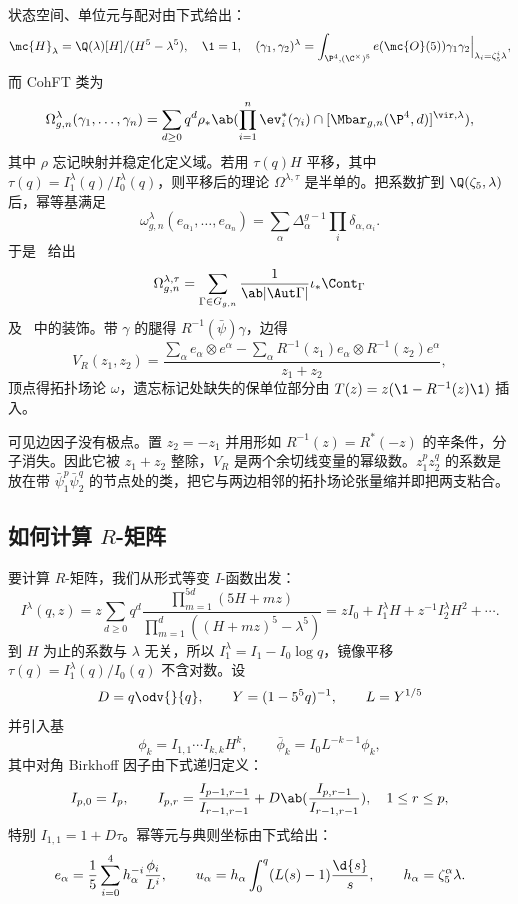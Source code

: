 状态空间、单位元与配对由下式给出：
\[ \mc{H}_{\lambda} = \Q(\lambda)[H]/(H^5-\lambda^5), \quad \1 = 1, \quad (\gamma_1,\gamma_2)^{\lambda} = \int_{\P^4, (\C^{\times})^5} e(\mc{O}(5))\gamma_1\gamma_2 \Big|_{\lambda_i = \zeta_5^i\lambda}, \]
而 CohFT 类为
\[ \Omega^{\lambda}_{g,n}(\gamma_1, \ldots, \gamma_n) = \sum_{d \geq 0} q^d \rho_* \ab( \prod_{i=1}^n \ev_i^*(\gamma_i) \cap [\Mbar_{g,n}(\P^4,d)]^{\vir,\lambda}), \]
其中 \(\rho\) 忘记映射并稳定化定义域。若用 \(\tau(q)H\) 平移，其中 \(\tau(q) = I^{\lambda}_1(q)/I^{\lambda}_0(q)\)，则平移后的理论 \(\Omega^{\lambda,\tau}\) 是半单的。把系数扩到 \(\Q(\zeta_5,\lambda)\) 后，幂等基满足
\[ \omega^{\lambda}_{g,n}(e_{\alpha_1}, \ldots, e_{\alpha_n}) = \sum_{\alpha}\Delta_{\alpha}^{g-1}\prod_i \delta_{\alpha,\alpha_i}. \]
于是~ 给出
\[ \Omega^{\lambda,\tau}_{g,n} = \sum_{\Gamma \in G_{g,n}} \frac{1}{\ab|\Aut\Gamma|}\iota_* \Cont_{\Gamma} \]
及~ 中的装饰。带 \(\gamma\) 的腿得 \(R^{-1}(\bar{\psi})\gamma\)，边得
\[ V_R(z_1,z_2) = \frac{\sum_{\alpha} e_{\alpha}\otimes e^{\alpha} - \sum_{\alpha} R^{-1}(z_1)e_{\alpha} \otimes R^{-1}(z_2)e^{\alpha}}{z_1+z_2}, \]
顶点得拓扑场论 \(\omega\)，遗忘标记处缺失的保单位部分由 \(T(z) = z(\1 - R^{-1}(z)\1)\) 插入。

\begin{rmk}
    可见边因子没有极点。置 \(z_2 = -z_1\) 并用形如 \(R^{-1}(z) = R^*(-z)\) 的辛条件，分子消失。因此它被 \(z_1+z_2\) 整除，\(V_R\) 是两个余切线变量的幂级数。\(z_1^p z_2^q\) 的系数是放在带 \(\bar{\psi}_1^p \bar{\psi}_2^q\) 的节点处的类，把它与两边相邻的拓扑场论张量缩并即把两支粘合。
\end{rmk}

\subsection{如何计算 \(R\)-矩阵}%
\label{sub:How to compute the R-matrix (Guo)}

要计算 \(R\)-矩阵，我们从形式等变 \(I\)-函数出发：
\[ I^{\lambda}(q,z) = z\sum_{d\geq0}q^d \frac{\prod_{m=1}^{5d}(5H+mz)}{\prod_{m=1}^d ((H+mz)^5 - \lambda^5)} = zI_0 + I_1^{\lambda}H + z^{-1}I_2^{\lambda}H^2 + \cdots. \]
到 \(H\) 为止的系数与 \(\lambda\) 无关，所以 \(I_1^{\lambda} = I_1 - I_0 \log q\)，镜像平移 \(\tau(q) = I_1^{\lambda}(q)/I_0(q)\) 不含对数。设
\[ D = q\odv{}{q}, \qquad Y = (1-5^5q)^{-1}, \qquad L = Y^{1/5} \]
并引入基
\[ \phi_k = I_{1,1}\cdots I_{k,k}H^k, \qquad \bar{\phi}_k = I_0 L^{-k-1}\phi_k, \]
其中对角 Birkhoff 因子由下式递归定义：
\[ I_{p,0} = I_p, \qquad I_{p,r} = \frac{I_{p-1,r-1}}{I_{r-1,r-1}} + D \ab( \frac{I_{p,r-1}}{I_{r-1,r-1}}), \quad 1 \leq r \leq p, \]
特别 \(I_{1,1} = 1+D\tau\)。幂等元与典则坐标由下式给出：
\[ e_{\alpha} = \frac{1}{5}\sum_{i=0}^4 h_{\alpha}^{-i}\frac{\phi_i}{L^i}, \qquad u_{\alpha} = h_{\alpha}\int_0^q (L(s)-1)\frac{\d{s}}{s}, \qquad h_{\alpha} = \zeta_5^{\alpha}\lambda. \]

